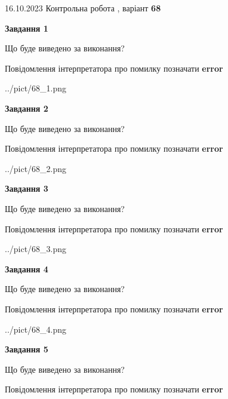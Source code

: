\documentclass[12pt, ukrainian]{article}
\begin{document}
{\Large{16.10.2023 Контрольна робота , варіант  \No \textbf { 68 }\par}}
{
\begin {large}
{\begin {center}\textbf{Завдання 1}\end {center}}\par
Що буде виведено за виконання? \par
Повідомлення інтерпретатора про помилку позначати \textbf{error}

\begin{center}
	{../pict/68_1.png}
\end{center}
\newpage

{\begin {center}\textbf{Завдання 2}\end {center}}\par
Що буде виведено за виконання? \par
Повідомлення інтерпретатора про помилку позначати \textbf{error}

\begin{center}
	{../pict/68_2.png}
\end{center}
\newpage

{\begin {center}\textbf{Завдання 3}\end {center}}\par
Що буде виведено за виконання? \par
Повідомлення інтерпретатора про помилку позначати \textbf{error}

\begin{center}
	{../pict/68_3.png}
\end{center}
\newpage

{\begin {center}\textbf{Завдання 4}\end {center}}\par
Що буде виведено за виконання? \par
Повідомлення інтерпретатора про помилку позначати \textbf{error}

\begin{center}
	{../pict/68_4.png}
\end{center}
\newpage

{\begin {center}\textbf{Завдання 5}\end {center}}\par
Що буде виведено за виконання? \par
Повідомлення інтерпретатора про помилку позначати \textbf{error}


\end{large}}
\end{document}
